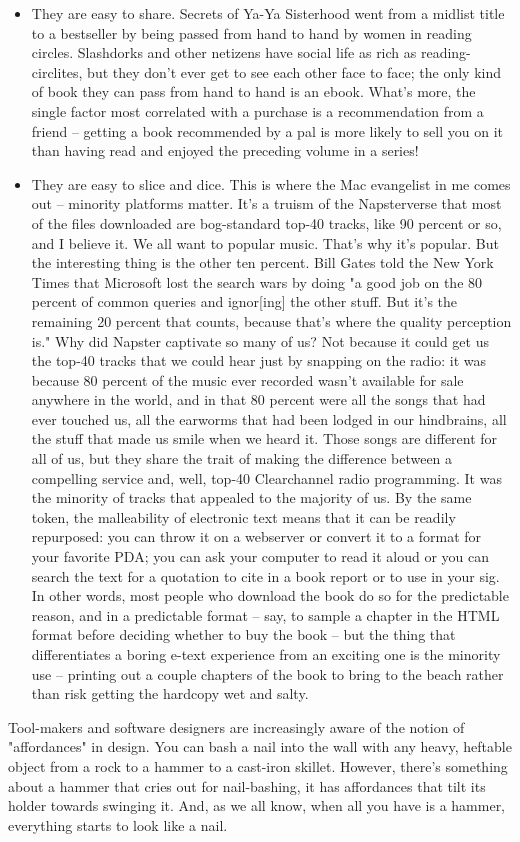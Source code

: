 \begin{itemize}
\item
  They are easy to share. Secrets of Ya-Ya Sisterhood went from a
  midlist title to a bestseller by being passed from hand to hand by
  women in reading circles. Slashdorks and other netizens have social
  life as rich as reading-circlites, but they don't ever get to see
  each other face to face; the only kind of book they can pass from
  hand to hand is an ebook. What's more, the single factor most
  correlated with a purchase is a recommendation from a friend --
  getting a book recommended by a pal is more likely to sell you on
  it than having read and enjoyed the preceding volume in a series!
\item
  They are easy to slice and dice. This is where the Mac evangelist
  in me comes out -- minority platforms matter. It's a truism of the
  Napsterverse that most of the files downloaded are bog-standard
  top-40 tracks, like 90 percent or so, and I believe it. We all want
  to popular music. That's why it's popular. But the interesting
  thing is the other ten percent. Bill Gates told the New York Times
  that Microsoft lost the search wars by doing "a good job on the 80
  percent of common queries and ignor[ing] the other stuff. But it's
  the remaining 20 percent that counts, because that's where the
  quality perception is." Why did Napster captivate so many of us?
  Not because it could get us the top-40 tracks that we could hear
  just by snapping on the radio: it was because 80 percent of the
  music ever recorded wasn't available for sale anywhere in the
  world, and in that 80 percent were all the songs that had ever
  touched us, all the earworms that had been lodged in our
  hindbrains, all the stuff that made us smile when we heard it.
  Those songs are different for all of us, but they share the trait
  of making the difference between a compelling service and, well,
  top-40 Clearchannel radio programming. It was the minority of
  tracks that appealed to the majority of us. By the same token, the
  malleability of electronic text means that it can be readily
  repurposed: you can throw it on a webserver or convert it to a
  format for your favorite PDA; you can ask your computer to read it
  aloud or you can search the text for a quotation to cite in a book
  report or to use in your sig. In other words, most people who
  download the book do so for the predictable reason, and in a
  predictable format -- say, to sample a chapter in the HTML format
  before deciding whether to buy the book -- but the thing that
  differentiates a boring e-text experience from an exciting one is
  the minority use -- printing out a couple chapters of the book to
  bring to the beach rather than risk getting the hardcopy wet and
  salty.
\end{itemize}
Tool-makers and software designers are increasingly aware of the
notion of "affordances" in design. You can bash a nail into the
wall with any heavy, heftable object from a rock to a hammer to a
cast-iron skillet. However, there's something about a hammer that
cries out for nail-bashing, it has affordances that tilt its holder
towards swinging it. And, as we all know, when all you have is a
hammer, everything starts to look like a nail.

